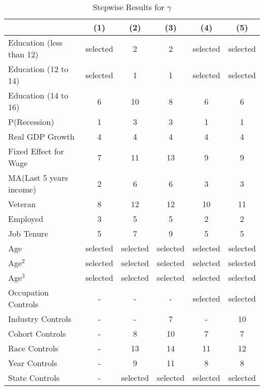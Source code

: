 \documentclass[12pt]{article}
\begin{document}
\begin{table}[H]
\centering
\caption{Stepwise Results for $\gamma$}

\begin{tabular}{lccccc}

\toprule
                    & (1)     & (2)   & (3)    & (4)      & (5)         \\

\midrule
Education (less than 12)                & selected  & 2    & 2  & selected   & selected    \\
Education (12 to 14)                & selected  & 1    & 1  & selected   & selected    \\
Education (14 to 16)                & 6  & 10    & 8  & 6   & 6    \\
P(Recession)             & 1   & 3     & 3   & 1    & 1     \\
Real GDP Growth            & 4   & 4     & 4   & 4    & 4     \\
Fixed Effect for Wage         & 7   & 11     & 13   & 9    & 9     \\
MA(Last 5 years income)              & 2   & 6     & 6   & 3    & 3     \\
Veteran             & 8   & 12     & 12   & 10    & 11     \\
Employed                 & 3   & 5     & 5   & 2    & 2     \\
Job Tenure               & 5   & 7     & 9   & 5    & 5     \\
Age          & selected   & selected     & selected   & selected   & selected     \\
Age$^2$        & selected  & selected    & selected  & selected   & selected    \\
Age$^3$      & selected  & selected    & selected  & selected   & selected    \\

\midrule
Occupation Controls      & -   & -    & -  & selected   & selected    \\
Industry Controls      & -  & -    & 7  & -   & 10    \\
Cohort Controls      & -  & 8    & 10  & 7   & 7    \\
Race Controls      & -  & 13    & 14  & 11   & 12    \\
Year Controls      & -  & 9    & 11  & 8   & 8    \\
State Controls      & -  & selected    & selected  & selected   & selected    \\


\end{tabular}
\end{table}
\end{document}
